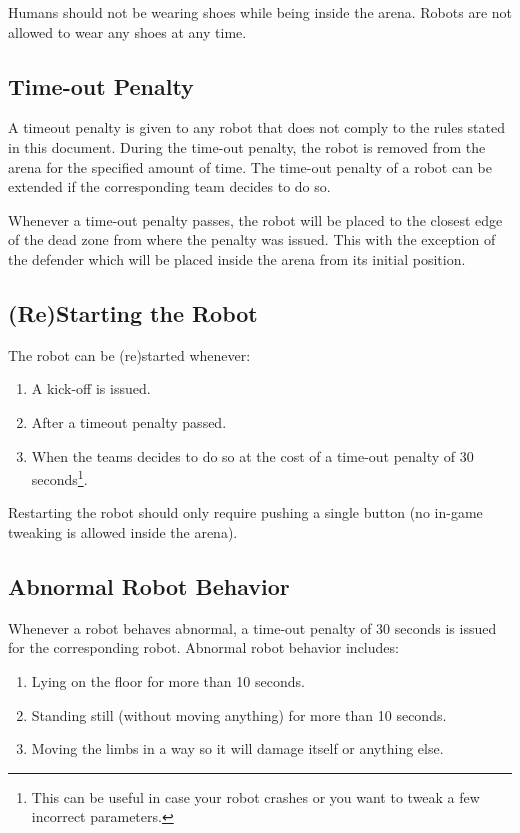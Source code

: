 \documentclass[a4paper, 12pt, oneside]{article}
\begin{document}
Humans should not be wearing shoes while being inside the arena.
Robots are not allowed to wear any shoes at any time. 

\subsection{Time-out Penalty}

A timeout penalty is given to any robot that does not comply to the rules stated in this document.
During the time-out penalty, the robot is removed from the arena for the specified amount of time.
The time-out penalty of a robot can be extended if the corresponding team decides to do so.

Whenever a time-out penalty passes, the robot will be placed to the closest edge of the dead zone from where the penalty was issued.
This with the exception of the defender which will be placed inside the arena from its initial position.

\subsection{(Re)Starting the Robot}

The robot can be (re)started whenever:

\begin{enumerate}
    \item A kick-off is issued.
    \item After a timeout penalty passed.
    \item When the teams decides to do so at the cost of a time-out penalty of 30 seconds\footnote{This can be useful in case your robot crashes or you want to tweak a few incorrect parameters.}.
\end{enumerate}

Restarting the robot should only require pushing a single button (no in-game tweaking is allowed inside the arena).

\subsection{Abnormal Robot Behavior}

Whenever a robot behaves abnormal, a time-out penalty of 30 seconds is issued for the corresponding robot. 
Abnormal robot behavior includes:
\begin{enumerate}
    \item Lying on the floor for more than 10 seconds.
    \item Standing still (without moving anything) for more than 10 seconds.
    \item Moving the limbs in a way so it will damage itself or anything else.
\end{enumerate}
\end{document}

